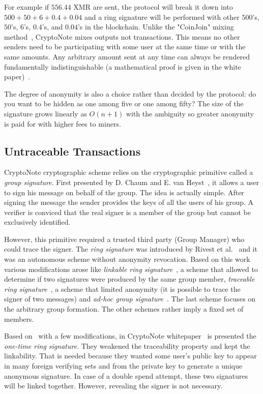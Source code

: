 For example if $556.44$ XMR are sent, the protocol will break it down into $500 + 50 + 6 + 0.4 + 0.04$ and a ring signature will be performed with other $500$'s, $50$'s, $6$'s, $0.4$'s, and $0.04$'s in the blockchain. Unlike the "CoinJoin" mixing method~\cite{coinjoin}, CryptoNote mixes outputs not transactions. This means no other senders need to be participating with some user at the same time or with the same amounts. Any arbitrary amount sent at any time can always be rendered fundamentally indistinguishable (a mathematical proof is given in the white paper)~\cite{citeulike:14139412}.

The degree of anonymity is also a choice rather than decided by the protocol: do you want to be hidden as one among five or one among fifty? The size of the signature grows linearly as $O(n+1)$ with the ambiguity so greater anonymity is paid for with higher fees to miners.

\subsection{Untraceable Transactions}
CryptoNote cryptographic scheme relies on the cryptographic primitive called a \emph{group signature}. First presented by D. Chaum and E. van Heyst~\cite{group}, it allows a user to sign his message on behalf of the group. The idea is actually simple. After signing the message the sender provides the keys of all the users of his group. A verifier is conviced that the real signer is a member of the group but cannot be exclusively identified.

However, this primitive required a trusted third party (Group Manager) who could trace the signer. The \emph{ring signature} was introduced by Rivest et al.~\cite{ring} and it was an autonomous scheme without anonymity revocation. Based on this work various modifications arose like \emph{linkable ring signature}~\cite{link1,link2,short}, a scheme that allowed to determine if two signatures were produced by the same group member, \emph{traceable ring signature}~\cite{traceable1,traceable2}, a scheme that limited anonymity (it is possible to trace the signer of two messages) and \emph{ad-hoc group signature}~\cite{ad-hoc1,ad-hoc2}. The last scheme focuses on the arbitrary group formation. The other schemes rather imply a fixed set of members.

Based on~\cite{traceable2} with a few modifications, in CryptoNote whitepaper~\cite{citeulike:14139412} is presented the \emph{one-time ring signature}. They weakened the traceability property and kept the linkability. That is needed because they wanted some user's public key to appear in many foreign verifying sets and from the private key to generate a unique anonymous signature. In case of a double spend attempt, these two signatures will be linked together. However, revealing the signer is not necessary.

